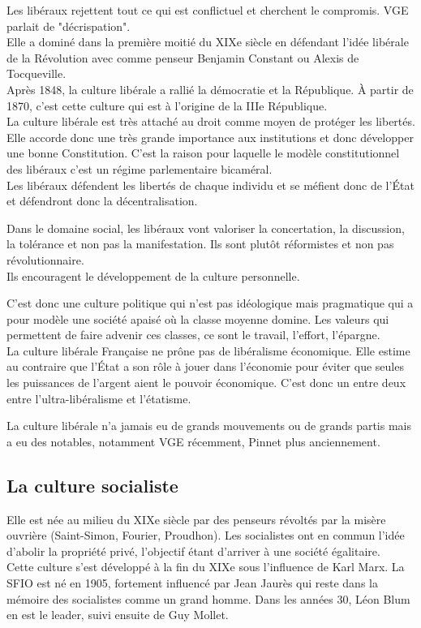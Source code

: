 \documentclass[12pt, a4paper, openany]{book}
\begin{document}
Les libéraux rejettent tout ce qui est conflictuel et cherchent le compromis. VGE parlait de "décrispation". \\
Elle a dominé dans la première moitié du XIXe siècle en défendant l'idée libérale de la Révolution avec comme penseur Benjamin Constant ou Alexis de Tocqueville. \\
Après 1848, la culture libérale a rallié la démocratie et la République. À partir de 1870, c'est cette culture qui est à l'origine de la IIIe République. \\
La culture libérale est très attaché au droit comme moyen de protéger les libertés. Elle accorde donc une très grande importance aux institutions et donc développer une bonne Constitution. C'est la raison pour laquelle le modèle constitutionnel des libéraux c'est un régime parlementaire bicaméral. \\
Les libéraux défendent les libertés de chaque individu et se méfient donc de l'État et défendront donc la décentralisation. 


Dans le domaine social, les libéraux vont valoriser la concertation, la discussion, la tolérance et non pas la manifestation. Ils sont plutôt réformistes et non pas révolutionnaire. \\
Ils encouragent le développement de la culture personnelle.


C'est donc une culture politique qui n'est pas idéologique mais pragmatique qui a pour modèle une société apaisé où la classe moyenne domine. Les valeurs qui permettent de faire advenir ces classes, ce sont le travail, l'effort, l'épargne. \\
La culture libérale Française ne prône pas de libéralisme économique. Elle estime au contraire que l'État a son rôle à jouer dans l'économie pour éviter que seules les puissances de l'argent aient le pouvoir économique. C'est donc un entre deux entre l'ultra-libéralisme et l'étatisme.


La culture libérale n'a jamais eu de grands mouvements ou de grands partis mais a eu des notables, notamment VGE récemment, Pinnet plus anciennement. 


\subsection{La culture socialiste}

Elle est née au milieu du XIXe siècle par des penseurs révoltés par la misère ouvrière (Saint-Simon, Fourier, Proudhon). Les socialistes ont en commun l'idée d'abolir la propriété privé, l'objectif étant d'arriver à une société égalitaire. \\
Cette culture s'est développé à la fin du XIXe sous l'influence de Karl Marx. La SFIO est né en 1905, fortement influencé par Jean Jaurès qui reste dans la mémoire des socialistes comme un grand homme. Dans les années 30, Léon Blum en est le leader, suivi ensuite de Guy Mollet.
\end{document}
